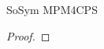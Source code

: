 \begin{copiedFrom}{SoSym MPM4CPS}
\begin{proof}
       
        
    
    
\end{proof}



\end{copiedFrom}
